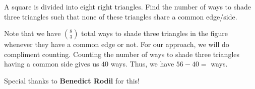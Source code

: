 \documentclass[11pt,paper=letter]{scrartcl}
\begin{document}
\begin{probboxed}
A square is divided into eight right triangles. Find the number of ways to shade three triangles such that none of these triangles share a common edge/side.
   
   \begin{center}
 



   \end{center}
   
\end{probboxed}





Note that we have $\binom 83$ total ways to shade three triangles in the figure whenever they have a common edge or not. For our approach, we will do compliment counting. Counting the number of ways to shade three triangles having a common side gives us $40$ ways. Thus, we have $56-40 =$  ways.


\begin{mdframed}
\begin{rem}
Special thanks to \textbf{Benedict Rodil} for this!
\end{rem}
\end{mdframed}

\newpage
\end{document}
